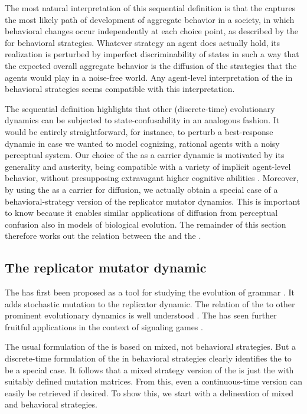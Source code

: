 \documentclass[fleqn,reqno,10pt]{article}
\newcommand{\rd}{\acro{rd}} %
\newcommand{\rmd}{\acro{rmd}} %
\newcommand{\rdd}{\acro{rdd}} %
\begin{document}
The most natural interpretation of this sequential definition is that
the \rdd captures the most likely path of development of aggregate
behavior in a society, in which behavioral
changes occur independently at each choice point, as described by the
\rd for behavioral strategies. Whatever strategy an agent does
actually hold, its realization is perturbed by imperfect
discriminability of states in such a way that the expected overall
aggregate behavior is the diffusion of the strategies that the agents
would play in a noise-free world. Any agent-level interpretation of
the \rd in behavioral strategies seems compatible with this
interpretation.

The sequential definition highlights that other (discrete-time)
evolutionary dynamics can be subjected to state-confusability in an
analogous fashion. It would be entirely straightforward, for instance,
to perturb a best-response dynamic in case we wanted to model
cognizing, rational agents with a noisy perceptual system. Our choice
of the \rd as a carrier dynamic is motivated by its generality and
austerity, being compatible with a variety of implicit agent-level
behavior, without presupposing extravagant higher cognitive abilities
\citep[c.f.][]{Sandholm2013:Population-Game}. Moreover, by using the
\rd as a carrier for diffusion, we actually obtain a special case of a
behavioral-strategy version of the replicator mutator dynamics. This
is important to know because it enables similar applications of
diffusion from perceptual confusion also in models of biological
evolution. The remainder of this section therefore works out the
relation between the \rdd and the \rmd.

\subsection{The replicator mutator dynamic}
\label{sec:repl-mutat-dynam}

The \rmd has first been proposed as a tool for studying the evolution
of grammar
\citep[e.g.][]{KomarovaNiyogi2001:The-Evolutionar,NowakKomarova2001:Evolution-of-Un}. It
adds stochastic mutation to the replicator dynamic. The relation of
the \rmd to other prominent evolutionary dynamics is well understood
\citep{PageNowak2002:Unifying-Evolut}. The \rmd has seen further
fruitful applications in the context of signaling games
\citep[e.g.][]{HutteggerSkyrms2010:Evolutionary-Dy}.

The usual formulation of the \rmd is based on mixed, not behavioral
strategies. But a discrete-time formulation of the \rmd in behavioral
strategies clearly identifies the \rdd to be a special case. It
follows that a mixed strategy version of the \rdd is just the \rmd
with suitably defined mutation matrices. From this, even a
continuous-time version can easily be retrieved if desired. To show
this, we start with a delineation of mixed and behavioral strategies.
\end{document}
